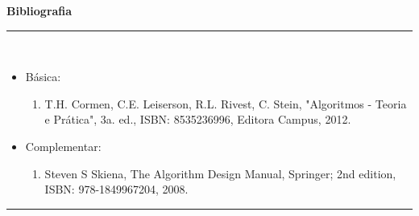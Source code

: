 \vspace{-12mm}
\begin{center}\textbf{Bibliografia}\end{center}
\vspace{-5mm}
\noindent\rule{16.5cm}{0.4pt}
\\
\begin{itemize} 
  \item Básica:
	\begin{enumerate}
	\item T.H. Cormen, C.E. Leiserson, R.L. Rivest, C. Stein, "Algoritmos - Teoria e Pr\'atica", 3a. ed., ISBN: 8535236996, Editora Campus, 2012.
	\end{enumerate}
  \item Complementar:
	\begin{enumerate} 
	\item Steven S Skiena, The Algorithm Design Manual, Springer; 2nd edition, ISBN: 978-1849967204, 2008.\\
	\end{enumerate}
\end{itemize}
\noindent\rule{16.5cm}{0.4pt}\\
\\
